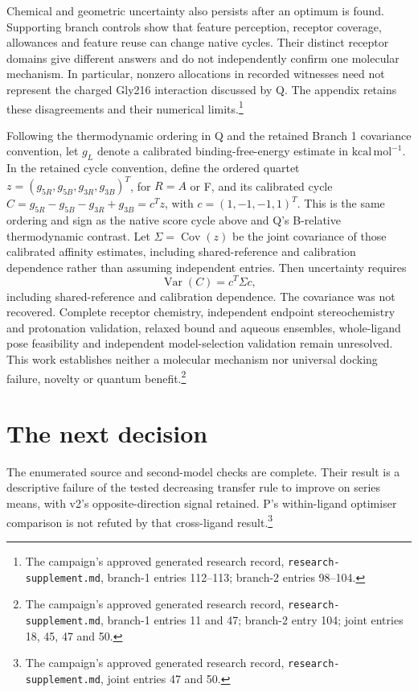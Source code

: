 \documentclass{article}
\newcommand{\rr}[1]{\footnote{The campaign's approved generated research record, \texttt{research-supplement.md}, #1.}}
\begin{document}
Chemical and geometric uncertainty also persists after an optimum is found. Supporting branch controls show that feature perception, receptor coverage, allowances and feature reuse can change native cycles. Their distinct receptor domains give different answers and do not independently confirm one molecular mechanism. In particular, nonzero allocations in recorded witnesses need not represent the charged Gly216 interaction discussed by Q. The appendix retains these disagreements and their numerical limits.\rr{branch-1 entries 112--113; branch-2 entries 98--104}

Following the thermodynamic ordering in Q and the retained Branch 1 covariance convention, let \(g_L\) denote a calibrated binding-free-energy estimate in \(\mathrm{kcal\,mol^{-1}}\). In the retained cycle convention, define the ordered quartet \(z=(g_{5R},g_{5B},g_{3R},g_{3B})^T\), for \(R=A\) or F, and its calibrated cycle \(C=g_{5R}-g_{5B}-g_{3R}+g_{3B}=c^Tz\), with \(c=(1,-1,-1,1)^T\). This is the same ordering and sign as the native score cycle above and Q's B-relative thermodynamic contrast. Let \(\Sigma=\operatorname{Cov}(z)\) be the joint covariance of those calibrated affinity estimates, including shared-reference and calibration dependence rather than assuming independent entries. Then uncertainty requires
\[
 \operatorname{Var}(C)=c^T\Sigma c,
\]
including shared-reference and calibration dependence. The covariance was not recovered. Complete receptor chemistry, independent endpoint stereochemistry and protonation validation, relaxed bound and aqueous ensembles, whole-ligand pose feasibility and independent model-selection validation remain unresolved. This work establishes neither a molecular mechanism nor universal docking failure, novelty or quantum benefit.\rr{branch-1 entries 11 and 47; branch-2 entry 104; joint entries 18, 45, 47 and 50}

\section{The next decision}

The enumerated source and second-model checks are complete. Their result is a descriptive failure of the tested decreasing transfer rule to improve on series means, with v2's opposite-direction signal retained. P's within-ligand optimiser comparison is not refuted by that cross-ligand result.\rr{joint entries 47 and 50}
\end{document}

